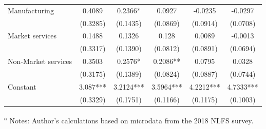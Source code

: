 \begin{table}[htbp]
{\begin{tabular}{lccccc}
\hspace{1em} Manufacturing & 0.4089 & 0.2366* & 0.0927 & -0.0235 & -0.0297 \\
		& (0.3285) & (0.1435) & (0.0869) & (0.0914) & (0.0708) \\
\hspace{1em} Market services & 0.1488 & 0.1326 & 0.128 & 0.0089 & -0.0013 \\
		& (0.3317) & (0.1390) & (0.0812) & (0.0891) & (0.0694) \\
\hspace{1em} Non-Market services & 0.3503 & 0.2576* & 0.2086** & 0.0795 & 0.0328 \\
		& (0.3175) & (0.1389) & (0.0824) & (0.0887) & (0.0744) \\
Constant & 3.087*** & 3.2124*** & 3.5964*** & 4.2212*** & 4.7333*** \\
		& (0.3329) & (0.1751) & (0.1166) & (0.1175) & (0.1003) \\

\bottomrule
\end{tabular}}
\footnotesize{
\raggedleft
\textsuperscript{a} Notes: Author's calculations based on microdata from the 2018 NLFS survey. }
\end{table}


